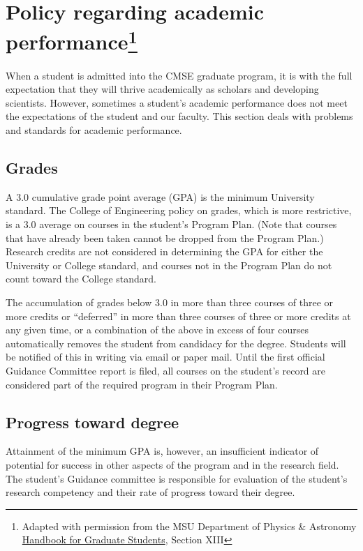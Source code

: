 \section[Policy regarding academic performance]{Policy regarding
  academic performance\footnote{Adapted with permission from the MSU
    Department of Physics \& Astronomy
    \href{https://www.pa.msu.edu/grad/GradHandbook_Aug2015.pdf}{Handbook
      for Graduate
      Students}, Section XIII}}

When a student is admitted into the CMSE graduate program, it is with
the full expectation that they will thrive academically as scholars
and developing scientists. However, sometimes a student's academic
performance does not meet the expectations of the student and our
faculty.  This section deals with problems and standards for academic
performance.

\subsection{Grades}

A 3.0 cumulative grade point average (GPA) is the minimum University
standard.  The College of Engineering policy on grades, which is more
restrictive, is a 3.0 average on courses in the student's Program
Plan.  (Note that courses that have already been taken cannot be
dropped from the Program Plan.)  Research credits are not considered in determining the
GPA for either the University or College standard, and courses not in
the Program Plan do not count toward the College standard. 

The accumulation of grades below 3.0 in more than three courses of
three or more credits or ``deferred'' in more than three courses of
three or more credits at any given time, or a combination of the above
in excess of four courses automatically removes the student from
candidacy for the degree.  Students will be notified of this in
writing via email or paper mail.  Until the first official Guidance Committee
report is filed, all courses on the student's record are considered
part of the required program in their Program Plan.

\subsection{Progress toward degree}

Attainment of the minimum GPA is, however, an insufficient
indicator of potential for success in other aspects of the program and
in the research field. The student's Guidance committee is responsible
for evaluation of the student's research competency and their rate of
progress toward their degree. 

